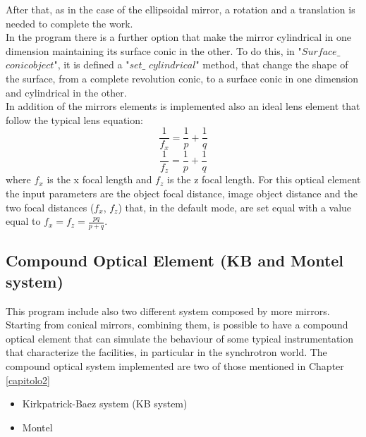 %
After that, as in the case of the ellipsoidal mirror, a rotation and a translation is needed to complete the work.
\\
In the program there is a further option that make the mirror cylindrical in one dimension maintaining its surface conic in the other. To do this, in "$Surface\_$ $conic object$", it is defined a "$set\_$ $cylindrical$" method, that change the shape of the surface, from a complete revolution conic, to a surface conic in one dimension and cylindrical in the other.
\\
In addition of the mirrors elements is implemented also an ideal lens element that follow the typical lens equation:
\begin{equation}
		\frac{1}{f_x} = \frac{1}{p} + \frac{1}{q}
		\label{eq: lens equation1}
\end{equation}
\begin{equation}
		\frac{1}{f_z} = \frac{1}{p} + \frac{1}{q}
		\label{eq: lens equation2}
\end{equation}
where $f_x $ is the x focal length and $f_z $ is the z focal length. For this optical element the input parameters are the object focal distance, image object distance and the two focal distances ($f_x $, $f_z $) that, in the default mode, are set equal with a value equal to $f_x = f_z = \frac{pq}{p+q} $.

\subsection{Compound Optical Element (KB and Montel system)}

This program include also two different system composed by more mirrors. Starting from conical mirrors, combining them, is possible to have a compound optical element that can simulate the behaviour of some typical instrumentation that characterize the facilities, in particular in the synchrotron world. The compound optical system implemented are two of those mentioned in Chapter \ref{capitolo2}
\begin{itemize}
\item Kirkpatrick-Baez system (KB system)
\item Montel
\end{itemize}

